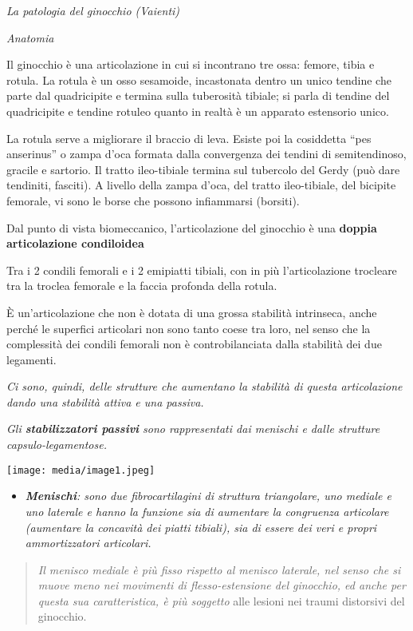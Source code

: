 \documentclass[]{article}
\date{}
\begin{document}
\emph{La patologia del ginocchio (Vaienti)}

\emph{Anatomia}

Il ginocchio è una articolazione in cui si incontrano tre ossa: femore,
tibia e rotula. La rotula è un osso sesamoide, incastonata dentro un
unico tendine che parte dal quadricipite e termina sulla tuberosità
tibiale; si parla di tendine del quadricipite e tendine rotuleo quanto
in realtà è un apparato estensorio unico.

La rotula serve a migliorare il braccio di leva. Esiste poi la
cosiddetta ``pes anserinus'' o zampa d'oca formata dalla convergenza dei
tendini di semitendinoso, gracile e sartorio. Il tratto ileo-tibiale
termina sul tubercolo del Gerdy (può dare tendiniti, fasciti). A livello
della zampa d'oca, del tratto ileo-tibiale, del bicipite femorale, vi
sono le borse che possono infiammarsi (borsiti).

Dal punto di vista biomeccanico, l'articolazione del ginocchio è una
\textbf{doppia articolazione condiloidea}

Tra i 2 condili femorali e i 2 emipiatti tibiali, con in più
l'articolazione trocleare tra la troclea femorale e la faccia profonda
della rotula.

È un'articolazione che non è dotata di una grossa stabilità intrinseca,
anche perché le superfici articolari non sono tanto coese tra loro, nel
senso che la complessità dei condili femorali non è controbilanciata
dalla stabilità dei due legamenti.

\emph{Ci sono, quindi, delle strutture che aumentano la stabilità di
questa articolazione dando una stabilità attiva e una passiva.}

\emph{Gli \textbf{stabilizzatori passivi} sono rappresentati dai
menischi e dalle strutture capsulo-legamentose.}

\texttt{[image: media/image1.jpeg]}

\begin{itemize}
\item
  \emph{\textbf{Menischi}: sono due fibrocartilagini di struttura
  triangolare, uno mediale e uno laterale e hanno la funzione sia di
  aumentare la congruenza articolare (aumentare la concavità dei piatti
  tibiali), sia di essere dei veri e propri ammortizzatori articolari. }
\end{itemize}

\begin{quote}
\emph{Il menisco mediale è più fisso rispetto al menisco laterale, nel
senso che si muove meno nei movimenti di flesso-estensione del
ginocchio, ed anche per questa sua caratteristica, è più soggetto} alle
lesioni nei traumi distorsivi del ginocchio.
\end{quote}
\end{document}
